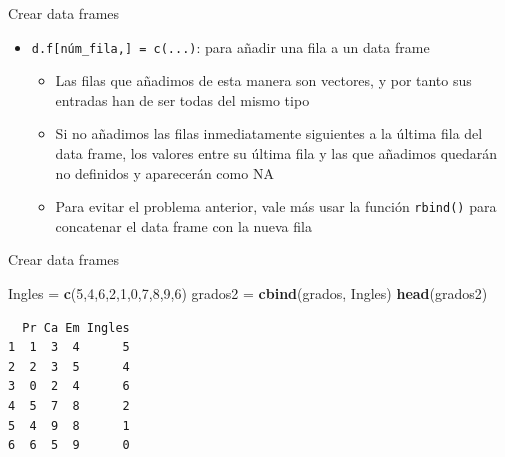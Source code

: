 \documentclass[
  ignorenonframetext,
  aspectratio=169]{beamer}
\newenvironment{Shaded}{\begin{snugshade}}{\end{snugshade}}
\newcommand{\DecValTok}[1]{\textcolor[rgb]{0.00,0.00,0.81}{#1}}
\newcommand{\FunctionTok}[1]{\textcolor[rgb]{0.13,0.29,0.53}{\textbf{#1}}}
\newcommand{\NormalTok}[1]{#1}
\newcommand{\OtherTok}[1]{\textcolor[rgb]{0.56,0.35,0.01}{#1}}
\providecommand{\tightlist}{%
  \setlength{\itemsep}{0pt}\setlength{\parskip}{0pt}}
\begin{document}
\begin{frame}[fragile]{Crear data frames}
\label{crear-data-frames-3}
\begin{itemize}
\tightlist
\item
  \texttt{d.f{[}núm\_fila,{]}\ =\ c(...)}: para añadir una fila a un
  data frame

  \begin{itemize}
  \tightlist
  \item
    Las filas que añadimos de esta manera son vectores, y por tanto sus
    entradas han de ser todas del mismo tipo
  \item
    Si no añadimos las filas inmediatamente siguientes a la última fila
    del data frame, los valores entre su última fila y las que añadimos
    quedarán no definidos y aparecerán como NA
  \item
    Para evitar el problema anterior, vale más usar la función
    \texttt{rbind()} para concatenar el data frame con la nueva fila
  \end{itemize}
\end{itemize}
\end{frame}

\begin{frame}[fragile]{Crear data frames}
\label{crear-data-frames-4}
\begin{Shaded}
\begin{Highlighting}[]
\NormalTok{Ingles }\OtherTok{=} \FunctionTok{c}\NormalTok{(}\DecValTok{5}\NormalTok{,}\DecValTok{4}\NormalTok{,}\DecValTok{6}\NormalTok{,}\DecValTok{2}\NormalTok{,}\DecValTok{1}\NormalTok{,}\DecValTok{0}\NormalTok{,}\DecValTok{7}\NormalTok{,}\DecValTok{8}\NormalTok{,}\DecValTok{9}\NormalTok{,}\DecValTok{6}\NormalTok{)}
\NormalTok{grados2 }\OtherTok{=} \FunctionTok{cbind}\NormalTok{(grados, Ingles)}
\FunctionTok{head}\NormalTok{(grados2)}
\end{Highlighting}
\end{Shaded}

\begin{verbatim}
  Pr Ca Em Ingles
1  1  3  4      5
2  2  3  5      4
3  0  2  4      6
4  5  7  8      2
5  4  9  8      1
6  6  5  9      0
\end{verbatim}
\end{frame}
\end{document}
